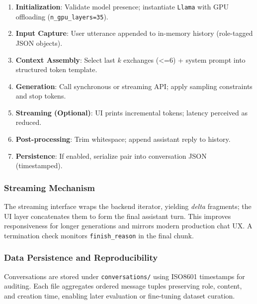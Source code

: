 \documentclass[12pt,a4paper]{article}
\begin{document}
\begin{enumerate}[leftmargin=1.2em]
    \item \textbf{Initialization}: Validate model presence; instantiate \texttt{Llama} with GPU offloading (\texttt{n\_gpu\_layers=35}).
    \item \textbf{Input Capture}: User utterance appended to in-memory history (role-tagged JSON objects).
    \item \textbf{Context Assembly}: Select last $k$ exchanges (<=6) + system prompt into structured token template.
    \item \textbf{Generation}: Call synchronous or streaming API; apply sampling constraints and stop tokens.
    \item \textbf{Streaming (Optional)}: UI prints incremental tokens; latency perceived as reduced.
    \item \textbf{Post-processing}: Trim whitespace; append assistant reply to history.
    \item \textbf{Persistence}: If enabled, serialize pair into conversation JSON (timestamped). 
\end{enumerate}

\subsubsection*{Streaming Mechanism}

The streaming interface wraps the backend iterator, yielding \emph{delta} fragments; the UI layer concatenates them to form the final assistant turn. This improves responsiveness for longer generations and mirrors modern production chat UX. A termination check monitors \texttt{finish\_reason} in the final chunk.

\subsubsection*{Data Persistence and Reproducibility}

Conversations are stored under \texttt{conversations/} using ISO8601 timestamps for auditing. Each file aggregates ordered message tuples preserving role, content, and creation time, enabling later evaluation or fine-tuning dataset curation.
\end{document}
